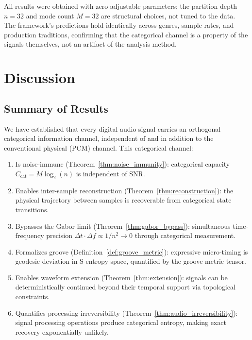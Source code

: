 \documentclass[twocolumn,10pt]{article}
\theoremstyle{remark}
\newcommand{\Ccat}{C_{\mathrm{cat}}}
\begin{document}
All results were obtained with zero adjustable parameters: the partition depth $n = 32$ and mode count $M = 32$ are structural choices, not tuned to the data. The framework's predictions hold identically across genres, sample rates, and production traditions, confirming that the categorical channel is a property of the signals themselves, not an artifact of the analysis method.




\section{Discussion}
\label{sec:discussion}

\subsection{Summary of Results}

We have established that every digital audio signal carries an orthogonal categorical information channel, independent of and in addition to the conventional physical (PCM) channel. This categorical channel:

\begin{enumerate}
    \item Is noise-immune (Theorem~\ref{thm:noise_immunity}): categorical capacity $\Ccat = M\log_2(n)$ is independent of SNR.

    \item Enables inter-sample reconstruction (Theorem~\ref{thm:reconstruction}): the physical trajectory between samples is recoverable from categorical state transitions.

    \item Bypasses the Gabor limit (Theorem~\ref{thm:gabor_bypass}): simultaneous time-frequency precision $\Delta t \cdot \Delta f \propto 1/n^2 \to 0$ through categorical measurement.

    \item Formalizes groove (Definition~\ref{def:groove_metric}): expressive micro-timing is geodesic deviation in S-entropy space, quantified by the groove metric tensor.

    \item Enables waveform extension (Theorem~\ref{thm:extension}): signals can be deterministically continued beyond their temporal support via topological constraints.

    \item Quantifies processing irreversibility (Theorem~\ref{thm:audio_irreversibility}): signal processing operations produce categorical entropy, making exact recovery exponentially unlikely.
\end{enumerate}
\end{document}
